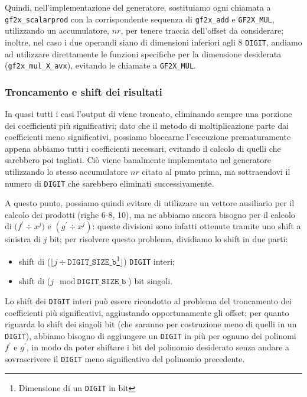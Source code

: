 Quindi, nell'implementazione del generatore, sostituiamo ogni chiamata a \texttt{gf2x\_scalarprod} con la corrispondente sequenza di \texttt{gf2x\_add} e \texttt{GF2X\_MUL},
utilizzando un accumulatore, $nr$, per tenere traccia dell'offset da considerare;
inoltre, nel caso i due operandi siano di dimensioni inferiori agli 8 \texttt{DIGIT}, andiamo ad utilizzare direttamente le funzioni specifiche per la dimensione
desiderata (\texttt{gf2x\_mul\_X\_avx}), evitando le chiamate a \texttt{GF2X\_MUL}.

\subsubsection*{Troncamento e shift dei risultati}
In quasi tutti i casi l'output di  viene troncato, eliminando sempre una porzione dei coefficienti più significativi; dato che il
metodo di moltiplicazione parte dai coefficienti meno significativi, possiamo bloccarne l'esecuzione prematuramente appena abbiamo tutti i coefficienti
necessari, evitando il calcolo di quelli che sarebbero poi tagliati. Ciò viene banalmente implementato  nel generatore utilizzando lo stesso accumulatore
$nr$ citato al punto prima, ma sottraendovi il numero di \texttt{DIGIT} che sarebbero eliminati successivamente. 

A questo punto, possiamo quindi evitare di utilizzare un vettore ausiliario per il calcolo dei prodotti (righe 6-8, 10), ma ne abbiamo ancora bisogno
per il calcolo di ${(f^{\prime}}\div{x^{j}})$ e $({g^{\prime}}\div{x^{j}})$: queste divisioni sono infatti ottenute tramite uno shift a sinistra di $j$ bit; per risolvere
questo problema, dividiamo lo shift in due parti:
\begin{itemize}
    \item shift di ($\lfloor{j}\div{\texttt{DIGIT\_SIZE\_b}}$\footnote{Dimensione di un \texttt{DIGIT} in bit}$\rfloor$) \texttt{DIGIT} interi;
    \item shift di ($j \mod \texttt{DIGIT\_SIZE\_b}$) bit singoli.
\end{itemize}
Lo shift dei \texttt{DIGIT} interi può essere ricondotto al problema del troncamento dei coefficienti più significativi, aggiustando opportunamente gli offset; per quanto riguarda
lo shift dei singoli bit (che saranno per costruzione meno di quelli in un \texttt{DIGIT}), abbiamo bisogno di aggiungere un \texttt{DIGIT} in più per ognuno dei polinomi
$f^{\prime}$ e $g^{\prime}$, in modo da poter shiftare i bit del polinomio desiderato senza andare a sovrascrivere il \texttt{DIGIT} meno significativo del polinomio precedente.
